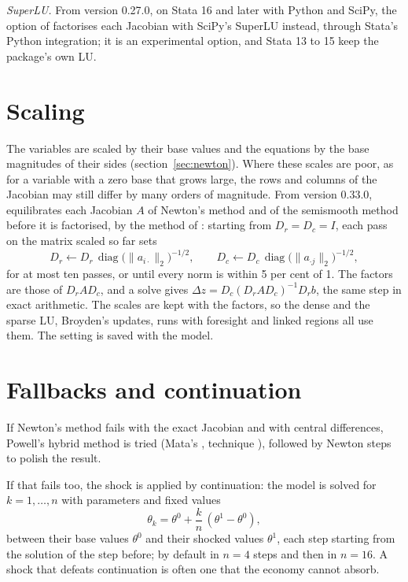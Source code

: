 \textit{SuperLU.} From version 0.27.0, on Stata 16 and later with Python and
SciPy, the option  of  factorises each Jacobian with
SciPy's SuperLU instead, through Stata's Python integration; it is an
experimental option, and Stata 13 to 15 keep the package's own LU.

\section{Scaling}\label{sec:scaling}

The variables are scaled by their base values and the equations by the base
magnitudes of their sides (section~\ref{sec:newton}). Where these scales are
poor, as for a variable with a zero base that grows large, the rows and
columns of the Jacobian may still differ by many orders of magnitude. From
version 0.33.0,  equilibrates each Jacobian
$A$ of Newton's method and of the semismooth method before it is factorised,
by the method of \citet{ruiz2001}: starting from $D_r = D_c = I$, each pass
on the matrix scaled so far sets
\begin{equation*}
D_r \leftarrow D_r\,\operatorname{diag}\bigl(\lVert a_{i\cdot}\rVert_2\bigr)^{-1/2},
\qquad
D_c \leftarrow D_c\,\operatorname{diag}\bigl(\lVert a_{\cdot j}\rVert_2\bigr)^{-1/2},
\end{equation*}
for at most ten passes, or until every norm is within 5 per cent of 1. The
factors are those of $D_r A D_c$, and a solve gives $\Delta z = D_c (D_r A
D_c)^{-1} D_r b$, the same step in exact arithmetic. The scales are kept with
the factors, so the dense and the sparse LU, Broyden's updates, runs with
foresight and linked regions all use them. The setting is saved with the
model.

\section{Fallbacks and continuation}\label{sec:continuation}

If Newton's method fails with the exact Jacobian and with central
differences, Powell's hybrid method is tried (Mata's , technique ),
followed by Newton steps to polish the result.

If that fails too, the shock is applied by continuation: the model is solved
for $k = 1, \dots, n$ with parameters and fixed values
\begin{equation*}
\theta_k = \theta^0 + \frac{k}{n}\,(\theta^1 - \theta^0),
\end{equation*}
between their base values $\theta^0$ and their shocked values $\theta^1$,
each step starting from the solution of the step before; by default in
$n = 4$ steps and then in $n = 16$. A shock that defeats continuation is often
one that the economy cannot absorb.

